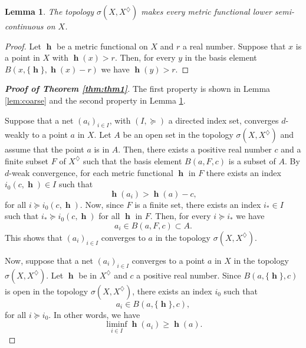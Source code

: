 \documentclass[11pt]{amsart}
\newtheorem{lemma}[theorem]{Lemma}
\theoremstyle{definition}
\numberwithin{equation}{section}
\DeclareMathOperator{\h}{\mathbf{h}} %
\numberwithin{equation}{section}
\begin{document}
\begin{lemma}\label{lem:lowersc}
The topology $\sigma(X,X^\diamondsuit)$ makes 
every metric functional lower semi-continuous on $X$.  
\end{lemma}

\begin{proof}
Let $\h$ be a metric functional on $X$ and $r$ a real number. 
Suppose that $x$ is a point in $X$ with $\h(x) > r$. Then,
for every $y$ in the basis element $B(x,\{\h\}, \h(x)-r)$
we have $\h(y) > r$.
\end{proof}

\begin{proof}[\bf Proof of Theorem \ref{thm:thm1}]
The first property is shown in Lemma \ref{lem:coarse} and 
the second property in Lemma \ref{lem:lowersc}.

Suppose that a net $(a_i)_{i\in I}$, with $(I,\succcurlyeq)$
a directed index set, converges $d$-weakly to a point $a$ 
in $X$. Let $A$ be an open set in the topology 
$\sigma(X,X^\diamondsuit)$ and assume that the point $a$ 
is in $A$. Then, there exists a positive real number $c$ 
and a finite subset $F$ of $X^\diamondsuit$ such that the 
basis element $B(a,F,c)$ is a subset of $A$.
By $d$-weak convergence, for each metric functional $\h$ 
in $F$ there exists an index $i_0(c,\h)\in I$  such that 
$$
    \h(a_i) > \h(a) - c,
$$
for all $i \succcurlyeq i_0(c,\h)$.
Now, since $F$ is a finite set, there exists an index $i_*\in I$ 
such that $i_* \succcurlyeq i_0(c,\h)$ for all $\h$ in $F$. 
Then, for every $i \succcurlyeq i_*$ we have 
$$
  a_i \in B(a,F,c) \subset A.  
$$
This shows that $(a_i)_{i\in I}$ converges to $a$ in the 
topology $\sigma(X,X^\diamondsuit)$.

Now, suppose that a net $(a_i)_{i\in I}$ converges to a point
$a$ in $X$ in the topology $\sigma(X,X^\diamondsuit)$. 
Let $\h$ be in $X^\diamondsuit$ and $c$ a positive real number. 
Since $B(a,\{\h\},c)$ is open in the topology 
$\sigma(X,X^\diamondsuit)$, there exists an index $i_0$ 
such that 
$$
    a_i \in B(a,\{\h\},c),
$$
for all $i \succcurlyeq i_0$. In other words, we have
$$
    \liminf_{i\in I} \h(a_i) \geq \h(a).
$$
\end{proof}
\end{document}
